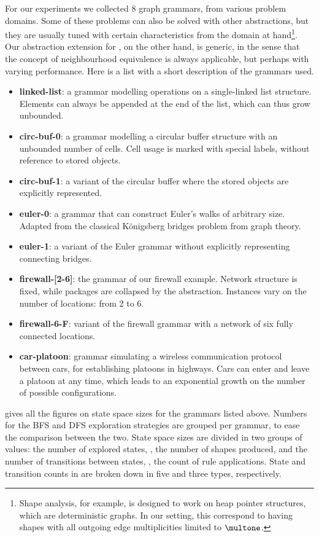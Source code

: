 For our experiments we collected 8 graph grammars, from various problem
domains. Some of these problems can also be solved with other abstractions, but
they are usually tuned with certain characteristics from the domain at
hand\footnote{Shape analysis, for example, is designed to work on heap pointer
structures, which are deterministic graphs. In our setting, this correspond to
having shapes with all outgoing edge multiplicities limited to $\multone$.}. Our
abstraction extension for \GROOVE, on the other hand, is generic, in the sense
that the concept of neighbourhood equivalence is always applicable, but perhaps
with varying performance. Here is a list with a short description of the
grammars used.
\begin{itemize}
\item {\bf linked-list}: a grammar modelling operations on a single-linked
list structure. Elements can always be appended at the end of the list, which
can thus grow unbounded.
\item {\bf circ-buf-0}: a grammar modelling a circular buffer structure with
an unbounded number of cells. Cell usage is marked with special labels, without
reference to stored objects.
\item {\bf circ-buf-1}: a variant of the circular buffer where the stored
objects are explicitly represented.
\item {\bf euler-0}: a grammar that can construct Euler's walks of arbitrary
size. Adapted from the classical K\"onigsberg bridges problem from graph theory.
\item {\bf euler-1}: a variant of the Euler grammar without explicitly
representing connecting bridges.
\item {\bf firewall-[2-6]}: the grammar of our firewall example. Network
structure is fixed, while packages are collapsed by the abstraction. Instances
vary on the number of locations: from 2 to 6.
\item {\bf firewall-6-F}: variant of the firewall grammar with a network of six
fully connected locations.
\item {\bf car-platoon}: grammar simulating a wireless communication protocol
between cars, for establishing platoons in highways. Cars can enter and leave a
platoon at any time, which leads to an exponential growth on the number of
possible configurations.
\end{itemize}

 gives all the figures on state space sizes for the grammars listed
above. Numbers for the BFS and DFS exploration strategies are grouped per
grammar, to ease the comparison between the two. State space sizes are divided
in two groups of values: the number of explored states, \ie, the number of
shapes produced, and the number of transitions between states, \ie, the count of
rule applications. State and transition counts in  are broken down in
five and three types, respectively.

